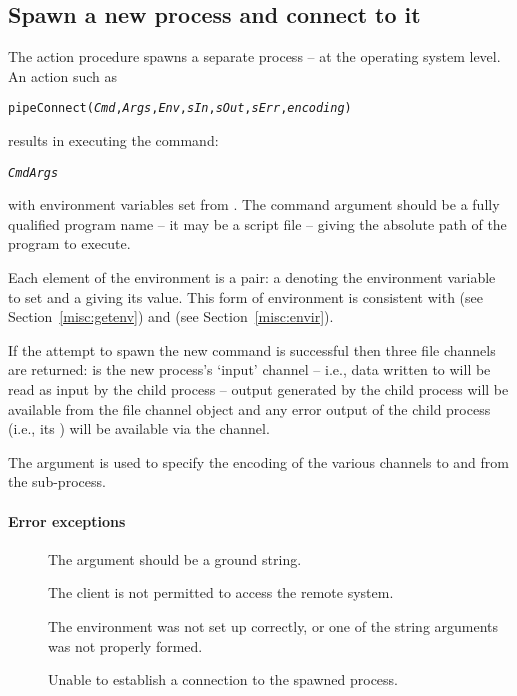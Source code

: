 \subsection{Spawn a new process and connect to it}
\label{io:pipeConnect}


The  action procedure spawns a separate process -- at the operating system level. An action such as
\begin{alltt}
pipeConnect(\emph{Cmd},\emph{Args},\emph{Env},\emph{sIn},\emph{sOut},\emph{sErr},\emph{encoding})
\end{alltt}
results in executing the command:
\begin{alltt}
\emph{Cmd Args}
\end{alltt}
with environment variables set from . The command argument  should be a fully qualified program name -- it may be a script file -- giving the absolute path of the program to execute.

Each element of the environment is a pair: a  denoting the environment variable to set and a  giving its value. This form of environment is consistent with  (see Section~\vref{misc:getenv}) and  (see Section~\vref{misc:envir}).

If the attempt to spawn the new command is successful then three file channels are returned:  is the new process's `input' channel -- i.e., data written to  will be read as input by the child process -- output generated by the child process will be available from the  file channel object and any error output of the child process (i.e., its ) will be available via the  channel.

The  argument is used to specify the encoding of the various channels to and from the sub-process.

\paragraph{Error exceptions}
\begin{description}
\item[]
The  argument should be a ground string.
\item[]
The client is not permitted to access the remote system.
\item[]
The environment was not set up correctly, or one of the string arguments was not properly formed.
\item[]
Unable to establish a connection to the spawned process.
\end{description}

